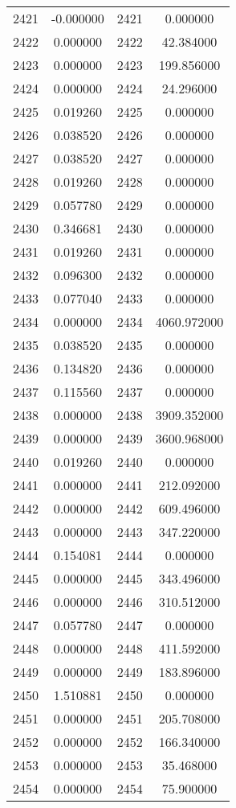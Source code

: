 \documentclass[12pt]{article}
\begin{document}
\begin{longtable}{@{}cccc@{}}
2421 & -0.000000 & 2421 & 0.000000 \\
2422 & 0.000000 & 2422 & 42.384000 \\
2423 & 0.000000 & 2423 & 199.856000 \\
2424 & 0.000000 & 2424 & 24.296000 \\
2425 & 0.019260 & 2425 & 0.000000 \\
2426 & 0.038520 & 2426 & 0.000000 \\
2427 & 0.038520 & 2427 & 0.000000 \\
2428 & 0.019260 & 2428 & 0.000000 \\
2429 & 0.057780 & 2429 & 0.000000 \\
2430 & 0.346681 & 2430 & 0.000000 \\
2431 & 0.019260 & 2431 & 0.000000 \\
2432 & 0.096300 & 2432 & 0.000000 \\
2433 & 0.077040 & 2433 & 0.000000 \\
2434 & 0.000000 & 2434 & 4060.972000 \\
2435 & 0.038520 & 2435 & 0.000000 \\
2436 & 0.134820 & 2436 & 0.000000 \\
2437 & 0.115560 & 2437 & 0.000000 \\
2438 & 0.000000 & 2438 & 3909.352000 \\
2439 & 0.000000 & 2439 & 3600.968000 \\
2440 & 0.019260 & 2440 & 0.000000 \\
2441 & 0.000000 & 2441 & 212.092000 \\
2442 & 0.000000 & 2442 & 609.496000 \\
2443 & 0.000000 & 2443 & 347.220000 \\
2444 & 0.154081 & 2444 & 0.000000 \\
2445 & 0.000000 & 2445 & 343.496000 \\
2446 & 0.000000 & 2446 & 310.512000 \\
2447 & 0.057780 & 2447 & 0.000000 \\
2448 & 0.000000 & 2448 & 411.592000 \\
2449 & 0.000000 & 2449 & 183.896000 \\
2450 & 1.510881 & 2450 & 0.000000 \\
2451 & 0.000000 & 2451 & 205.708000 \\
2452 & 0.000000 & 2452 & 166.340000 \\
2453 & 0.000000 & 2453 & 35.468000 \\
2454 & 0.000000 & 2454 & 75.900000 \\

\end{longtable}
\end{document}
